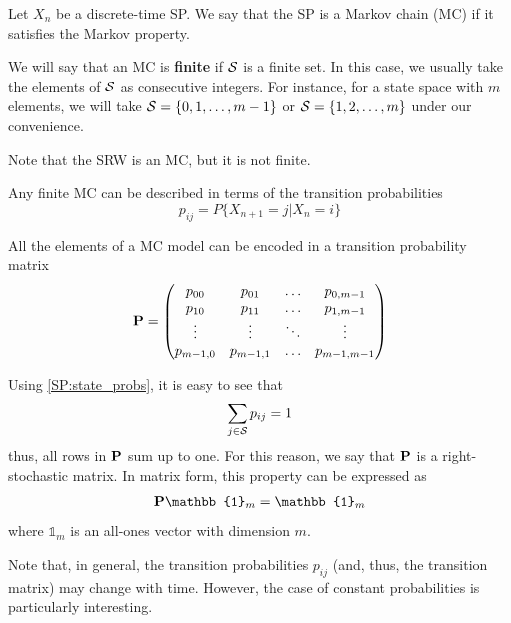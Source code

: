 \begin{definition}

Let $X_n$ be a discrete-time SP. We say that the SP is a Markov chain (MC) if it satisfies the Markov property. 

\end{definition}

We will say that an MC is \textbf{finite} if ${\cal S}$ is a finite set. In this case, we usually take the elements of ${\cal S}$ as consecutive integers. For instance, for a state space with $m$ elements, we will take ${\cal S} = \{0, 1, \ldots, m-1\}$ or ${\cal S} = \{1, 2, \ldots, m\}$ under our convenience.

Note that the SRW is an MC, but it is not finite. 

Any finite MC can be described in terms of the transition probabilities
\begin{equation}
\label{SP:state_probs}
p_{ij} = P\{X_{n+1}=j| X_n=i\}
\end{equation}

All the elements of a MC model can be encoded in a transition probability matrix
\begin{align}
{\bf P} = 
\begin{pmatrix}
p_{00} & p_{01} & \ldots & p_{0,m-1}  \\
p_{10} & p_{11} & \ldots & p_{1,m-1}  \\
\vdots & \vdots & \ddots & \vdots  \\
p_{m-1,0} & p_{m-1,1} & \ldots & p_{m-1,m-1} 
\end{pmatrix}
\end{align}

Using \eqref{SP:state_probs}, it is easy to see that
\begin{align}
\sum_{j \in {\cal S}} p_{ij} = 1
\end{align}
thus, all rows in ${\bf P}$ sum up to one. For this reason, we say that ${\bf P}$ is a right-stochastic matrix. In matrix form, this property can be expressed as
\begin{align}
{\bf P}\mathbb{1}_m = \mathbb{1}_m
\label{sp:psum1}
\end{align}
where $\mathbb{1}_m$ is an all-ones vector with dimension $m$.

Note that, in general, the transition probabilities $p_{ij} $ (and, thus, the transition matrix) may change with time. However, the case of constant probabilities is particularly interesting.

